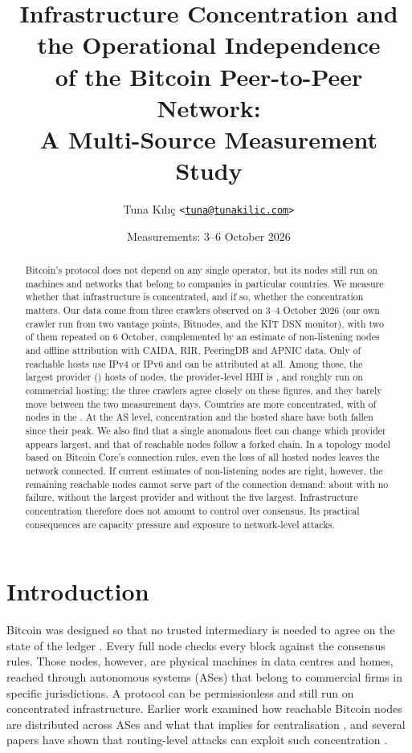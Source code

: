 \documentclass[10pt,a4paper]{article}
\title{Infrastructure Concentration and the Operational Independence\\of the Bitcoin Peer-to-Peer Network:\\A Multi-Source Measurement Study}
\author{
Tuna K{\i}l{\i}\c{c} \texttt{<\href{mailto:tuna@tunakilic.com}{tuna@tunakilic.com}>} \\}
\date{\small Measurements: 3--6 October 2026}
\begin{document}
\maketitle

\begin{abstract}
\noindent
Bitcoin's protocol does not depend on any single operator, but its nodes still run on machines and networks that belong to companies in particular countries. We measure whether that infrastructure is concentrated, and if so, whether the concentration matters. Our data come from three crawlers observed on 3--4 October 2026 (our own crawler run from two vantage points, Bitnodes, and the KIT DSN monitor), with two of them repeated on 6 October, complemented by an estimate of non-listening nodes and offline attribution with CAIDA, RIR, PeeringDB and APNIC data. Only \DtwoIPshare{} of reachable hosts use IPv4 or IPv6 and can be attributed at all. Among those, the largest provider (\DtwoFProvToponeLabel) hosts \DtwoFProvTopone{} of nodes, the provider-level HHI is \DtwoFProvHHI{}, and roughly \DtwoFHostedCentral{} run on commercial hosting; the three crawlers agree closely on these figures, and they barely move between the two measurement days. Countries are more concentrated, with \DtwoFCcTopone{} of nodes in the \DtwoFCcToponeLabel{}. At the AS level, concentration and the hosted share have both fallen since their \TSPeakYear{} peak. We also find that a single anomalous fleet can change which provider appears largest, and that \ForkShareAll{} of reachable nodes follow a forked chain. In a topology model based on Bitcoin Core's connection rules, even the loss of all hosted nodes leaves the network connected. If current estimates of non-listening nodes are right, however, the remaining reachable nodes cannot serve part of the connection demand: about \UnmetRelBase{} with no failure, \UnmetRelProv{} without the largest provider and \UnmetRelTopfive{} without the five largest. Infrastructure concentration therefore does not amount to control over consensus. Its practical consequences are capacity pressure and exposure to network-level attacks.
\end{abstract}

\section{Introduction}\label{sec:intro}

Bitcoin was designed so that no trusted intermediary is needed to agree on the state of the ledger \cite{nakamoto2008}. Every full node checks every block against the consensus rules. Those nodes, however, are physical machines in data centres and homes, reached through autonomous systems (ASes) that belong to commercial firms in specific jurisdictions. A protocol can be permissionless and still run on concentrated infrastructure. Earlier work examined how reachable Bitcoin nodes are distributed across ASes and what that implies for centralisation \cite{feld2014aslevel,saad2019partitioning}, and several papers have shown that routing-level attacks can exploit such concentration \cite{apostolaki2017hijacking,tran2020erebus,saad2019partitioning}.
\end{document}
